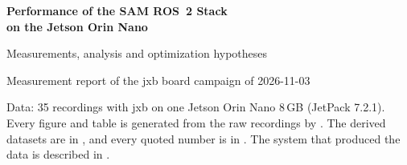 \documentclass[11pt,a4paper]{article}
\newcommand{\jxb}{\textsf{jxb}}
\begin{document}
\begin{titlepage}
\centering
\vspace*{2.8cm}
{\LARGE\bfseries Performance of the SAM ROS~2 Stack\\[2pt] on the Jetson Orin Nano\par}
\vspace{0.5cm}
{\large Measurements, analysis and optimization hypotheses\par}
\vspace{1.2cm}
{\normalsize Measurement report of the \jxb{} board campaign of 2026-11-03\par}
\vfill
\begin{minipage}{0.82\textwidth}\small
Data: 35 recordings with \jxb{} on one Jetson Orin Nano 8\,GB (JetPack 7.2.1). Every figure and table is generated
from the raw recordings by . The derived datasets are in
, and every quoted number is in . The system that
produced the data is described in .
\end{minipage}
\vspace{1.5cm}
\end{titlepage}
\end{document}
